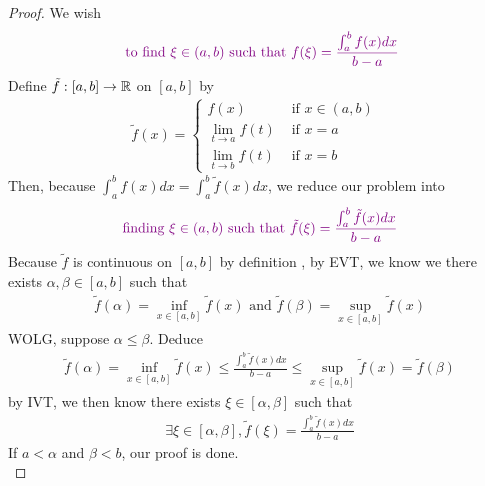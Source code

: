 \documentclass{report}
\begin{document}
\begin{proof}
We wish 
\begin{align*}
\textcolor{violet}{\text{ to find  }\xi \in (a,b)\text{ such that }f(\xi)=\frac{\int_a^b f(x)dx}{b-a}}
\end{align*}
Define $\tilde{f}:[a,b]\rightarrow \mathbb{R}$ on $[a,b]$ by 
\begin{align}
\label{M1}
\tilde{f}(x)=\begin{cases}
  f(x)& \text{ if $x \in (a,b)$ }\\
  \lim_{t\to a}f(t)& \text{ if $x=a$ }\\
  \lim_{t\to b}f(t)& \text{ if $x=b$ }
\end{cases}
\end{align}
Then, because $\int_a^b f(x)dx=\int_a^b \tilde{f}(x)dx $, we reduce our problem into  
\begin{align*}
\textcolor{violet}{\text{ finding $\xi\in(a,b)$ such that $\tilde{f} (\xi)= \frac{\int_a^b \tilde{f}(x)dx }{b-a}$ }}
\end{align*}
Because $\tilde{f} $ is continuous on $[a,b]$ by definition , by EVT, we know we there exists $\alpha,\beta  \in [a,b]$ such that 
\begin{align}
\label{M4}
\tilde{f} (\alpha )=\inf_{x \in [a,b]}\tilde{f}(x)\text{ and } \tilde{f}(\beta ) =\sup_{x \in[a,b]}\tilde{f}(x) 
\end{align}
WOLG, suppose $\alpha \leq \beta $. Deduce 
\begin{align*}
\tilde{f}(\alpha )= \inf_{x \in [a,b]}\tilde{f}(x)\leq \frac{\int_a^b \tilde{f}(x)dx }{b-a} \leq \sup_{x \in [a,b]}\tilde{f}(x) =\tilde{f}(\beta ) 
\end{align*}
by IVT, we then know there exists $\xi\in [\alpha ,\beta ]$ such that 
\begin{align}
\label{M3}
\exists \xi\in [\alpha ,\beta ], \tilde{f}(\xi)=\frac{\int_a^b \tilde{f}(x)dx }{b-a} 
\end{align}
If $a<\alpha $ and $\beta <b$, our proof is done.\\



\end{proof}
\end{document}
